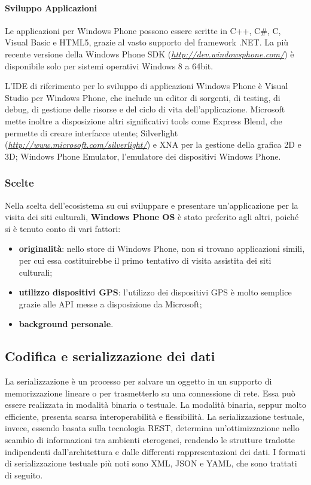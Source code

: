\paragraph{Sviluppo Applicazioni}
Le applicazioni per Windows Phone possono essere scritte in C++, C\#, C, Visual Basic e HTML5, grazie al vasto supporto del framework .NET.
La più recente versione della Windows Phone SDK (\emph{\url{http://dev.windowsphone.com/}}) è disponibile solo per sistemi operativi Windows 8 a 64bit.

L'IDE di riferimento per lo sviluppo di applicazioni Windows Phone è Visual Studio per Windows Phone, che include un editor di sorgenti, di testing, di debug, di gestione delle risorse e del ciclo di vita dell'applicazione.
Microsoft mette inoltre a disposizione altri significativi tools come Express Blend, che permette di creare interfacce utente; Silverlight (\emph{\url{http://www.microsoft.com/silverlight/}}) e XNA per la gestione della grafica 2D e 3D; Windows Phone Emulator, l'emulatore dei dispositivi Windows Phone.\\

\subsubsection{Scelte}
Nella scelta dell'ecosistema su cui sviluppare e presentare un'applicazione per la visita dei siti culturali, \textbf{Windows Phone OS} è stato preferito agli altri, poiché si è tenuto conto di vari fattori:
\begin{itemize}
\item \textbf{originalità}: nello store di Windows Phone, non si trovano applicazioni simili, per cui essa costituirebbe il primo tentativo di visita assistita dei siti culturali;
\item \textbf{utilizzo dispositivi GPS}: l'utilizzo dei dispositivi GPS è molto semplice grazie alle API messe a disposizione da Microsoft;
 \item \textbf{background personale}.
\end{itemize}

\clearpage{\pagestyle{empty}\cleardoublepage}

\subsection{Codifica e serializzazione dei dati}
La serializzazione è un processo  per salvare un oggetto in un supporto di memorizzazione lineare o per trasmetterlo su una connessione di rete.
Essa può essere realizzata in modalità binaria o testuale.
La modalità binaria, seppur molto efficiente, presenta scarsa interoperabilità e flessibilità.
La serializzazione testuale, invece, essendo basata sulla tecnologia REST, determina un'ottimizzazione nello scambio di informazioni tra ambienti eterogenei, rendendo le strutture tradotte indipendenti dall'architettura e dalle differenti rappresentazioni dei dati.
I formati di serializzazione testuale più noti sono XML, JSON e YAML, che  sono trattati di seguito.

